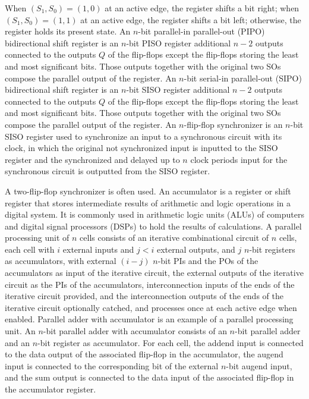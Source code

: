 \documentclass[a4paper,12pt]{report}
\begin{document}
When $(S_1,S_0)=(1,0)$ at an active edge, the register shifts a bit right; when $(S_1,S_0)=(1,1)$ at an active edge, the register shifts a bit left; otherwise, the register holds its present state.
An $n$-bit parallel-in parallel-out (PIPO) bidirectional shift register is an $n$-bit PISO register additional $n-2$ outputs connected to the outputs $Q$ of the flip-flops except the flip-flops storing the least and most significant bits. Those outputs together with the original two SOs compose the parallel output of the register.
An $n$-bit serial-in parallel-out (SIPO) bidirectional shift register is an $n$-bit SISO register additional $n-2$ outputs connected to the outputs $Q$ of the flip-flops except the flip-flops storing the least and most significant bits. Those outputs together with the original two SOs compose the parallel output of the register.
An $n$-flip-flop synchronizer is an $n$-bit SISO register used to synchronize an input to a synchronous circuit with its clock, in which the original not synchronized input is inputted to the SISO register and the synchronized and delayed up to $n$ clock periods input for the synchronous circuit is outputted from the SISO register.

A two-flip-flop synchronizer is often used.
An accumulator is a register or shift register that stores intermediate results of arithmetic and logic operations in a digital system. It is commonly used in arithmetic logic units (ALUs) of computers and digital signal processors (DSPs) to hold the results of calculations.
A parallel processing unit of $n$ cells consists of an iterative combinational circuit of $n$ cells, each cell with $i$ external inputs and $j<i$ external outputs, and $j$ $n$-bit registers as accumulators, with external $(i-j)$ $n$-bit PIs and the POs of the accumulators as input of the iterative circuit, the external outputs of the iterative circuit as the PIs of the accumulators, interconnection inputs of the ends of the iterative circuit provided, and the interconnection outputs of the ends of the iterative circuit optionally catched, and processes once at each active edge when enabled.
Parallel adder with accumulator is an example of a parallel processing unit. An $n$-bit parallel adder with accumulator consists of an $n$-bit parallel adder and an $n$-bit register as accumulator. For each cell, the addend input is connected to the data output of the associated flip-flop in the accumulator, the augend input is connected to the corresponding bit of the external $n$-bit augend input, and the sum output is connected to the data input of the associated flip-flop in the accumulator register.
\end{document}

